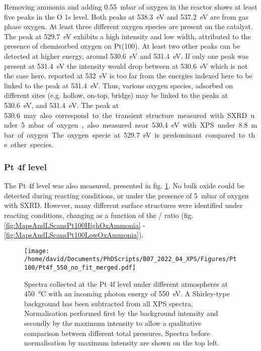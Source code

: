 Removing ammonia and adding \qty{0.55}{\milli\bar} of oxygen in the reactor shows at least five peaks in the O 1s level.
Both peaks at \qty{538.3}{\eV} and \qty{537.2}{\eV} are from gas phase oxygen.
At least three different oxygen species are present on the catalyst.
The peak at \qty{529.7}{\eV} exhibits a high intensity and low width, attributed to the presence of chemisorbed oxygen on Pt(100).
At least two other peaks can be detected at higher energy, around \qty{530.6}{\eV} and \qty{531.4}{\eV}.
If only one peak was present at \qty{531.4}{\eV} the intensity would drop between at \qty{530.6}{\eV} which is not the case here.
 reported at \qty{532}{\eV} \parencite{Kondratenko2006} is too far from the energies indexed here to be linked to the peak at \qty{531.4}{\eV}.
Thus, various oxygen species, adsorbed on different sites (e.g. hollow, on-top, bridge) may be linked to the peaks at \qty{530.6}{\eV}, and \qty{531.4}{\eV}.
The peak at \qty{530.6} may also correspond to the transient structure measured with SXRD under \qty{5}{\milli\bar} of oxygen, also measured near \qty{530.4}{\eV} with XPS under \qty{8.8}{\milli\bar} of oxygen.
The oxygen specie at \qty{529.7}{\eV} is predominant compared to the other species.

\subsubsection{Pt 4f level}

The Pt 4f level was also measured, presented in fig. \ref{fig:Pt4fPt100}.
No bulk oxide could be detected during reacting conditions, or under the presence of \qty{5}{\milli\bar} of oxygen with SXRD.
However, many different surface structures were identified under reacting conditions, changing as a function of the / ratio (fig. \ref{fig:MapsAndLScansPt100HighOxAmmonia} - \ref{fig:MapsAndLScansPt100LowOxAmmonia}).

\begin{figure}[!htb]
    \centering
    \texttt{[image: /home/david/Documents/PhDScripts/B07\_2022\_04\_XPS/Figures/Pt100/Pt4f\_550\_no\_fit\_merged.pdf]}
    \caption{
        Spectra collected at the Pt 4f level under different atmospheres at \qty{450}{\degreeCelsius} with an incoming photon energy of \qty{550}{\eV}.
        A Shirley-type background has been subtracted from all XPS spectra.
        Normalisation performed first by the background intensity and secondly by the maximum intensity to allow a qualitative comparison between different total pressures.
        Spectra before normalisation by maximum intensity are shown on the top left.
    }
    \label{fig:Pt4fPt100}
\end{figure}

